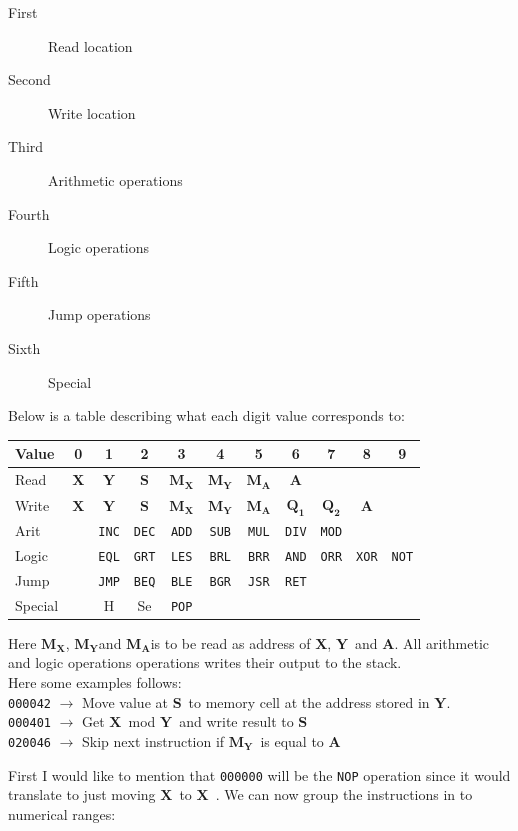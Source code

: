 \documentclass{article}
\newcommand{\V}{\verb}
\newcommand{\x}{$\textbf{X}$}
\newcommand{\y}{$\textbf{Y}$}
\newcommand{\s}{$\textbf{S}$}
\newcommand{\A}{$\textbf{A}$}
\newcommand{\mx}{$\textbf{M}_{\textbf{X}}$}
\newcommand{\my}{$\textbf{M}_{\textbf{Y}}$}
\newcommand{\ma}{$\textbf{M}_{\textbf{A}}$}
\newcommand{\q}{$\textbf{Q}_{\textbf{1}}$}
\newcommand{\qq}{$\textbf{Q}_{\textbf{2}}$}
\begin{document}
\begin{description}
  \item[First] Read location
  \item[Second] Write location
  \item[Third] Arithmetic operations
  \item[Fourth] Logic operations
  \item[Fifth] Jump operations
  \item[Sixth] Special
\end{description}
Below is a table describing what each digit value corresponds to:
\begin{center}
\begin{tabular}{l || *{10}{c |}}
Value & 0 & 1 & 2 & 3 & 4 & 5 & 6 & 7 & 8 & 9 \\
\hline
Read & \x & \y & \s  &\mx & \my & \ma & \A & & & \\

Write & \x & \y & \s  &\mx & \my & \ma & \q& \qq & \A &\\

Arit &  & \V+INC+ & \V+DEC+ & \V+ADD+ & \V+SUB+ & \V+MUL+ & \V+DIV+ & \V+MOD+  &
&
\\

Logic &  &  \V+EQL+ & \V+GRT+ & \V+LES+ & \V+BRL+ & \V+BRR+ & \V+AND+ & \V+ORR+
& \V+XOR+ & \V+NOT+\\

Jump & & \V+JMP+ & \V+BEQ+ & \V+BLE+ & \V+BGR+ & \V+JSR+ & \V+RET+ & & & \\

Special & & H & Se & \V+POP+ &  &  &  &  &  &  \\
\end{tabular}
\end{center}
Here \mx , \my and \ma is to be read as address of \x , \y \ and \A.  All
arithmetic and logic operations operations writes their output to the stack.\\
Here some examples follows:\\
\verb+000042+ $\rightarrow$ Move value at \s \ to memory cell at the address
stored in \y. \\
\verb+000401+ $\rightarrow$ Get \x \ mod \y \ and write result to \s \\
\verb+020046+ $\rightarrow$ Skip next instruction if \my \ is equal to \A \\
\newpage

First I would like to  mention that
\verb+000000+ will be the \verb+NOP+ operation since it would translate to just
moving \x \ to \x \ .
We can now group the instructions in to numerical ranges:
\end{document}
